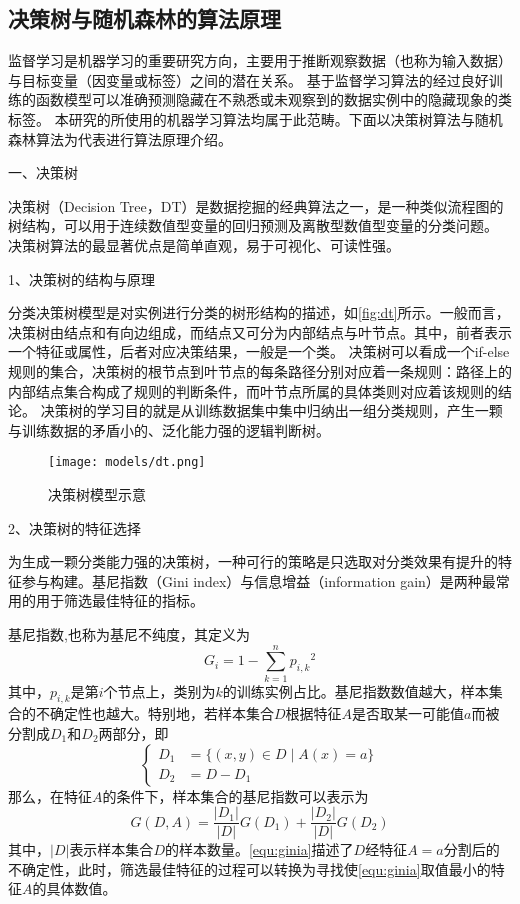 \subsection{决策树与随机森林的算法原理}
监督学习是机器学习的重要研究方向，主要用于推断观察数据（也称为输入数据）与目标变量（因变量或标签）之间的潜在关系。
基于监督学习算法的经过良好训练的函数模型可以准确预测隐藏在不熟悉或未观察到的数据实例中的隐藏现象的类标签。
本研究的所使用的机器学习算法均属于此范畴。下面以决策树算法与随机森林算法为代表进行算法原理介绍。

一、决策树

决策树（Decision Tree，DT）是数据挖掘的经典算法之一，是一种类似流程图的树结构，可以用于连续数值型变量的回归预测及离散型数值型变量的分类问题\cite{Li2017,Liu2018}。
决策树算法的最显著优点是简单直观，易于可视化、可读性强。

1、决策树的结构与原理

分类决策树模型是对实例进行分类的树形结构的描述，如\autoref{fig:dt}所示。一般而言，决策树由结点和有向边组成，而结点又可分为内部结点与叶节点。其中，前者表示一个特征或属性，后者对应决策结果，一般是一个类\cite{Li2017,Zhou2016}。
决策树可以看成一个if-else规则的集合，决策树的根节点到叶节点的每条路径分别对应着一条规则：路径上的内部结点集合构成了规则的判断条件，而叶节点所属的具体类则对应着该规则的结论。
决策树的学习目的就是从训练数据集中集中归纳出一组分类规则，产生一颗与训练数据的矛盾小的、泛化能力强的逻辑判断树。
\begin{figure}[htbp]
      \centering
      \texttt{[image: models/dt.png]}
      \caption{\label{fig:dt}决策树模型示意}
\end{figure}

2、决策树的特征选择

为生成一颗分类能力强的决策树，一种可行的策略是只选取对分类效果有提升的特征参与构建。基尼指数（Gini index）与信息增益（information gain）是两种最常用的用于筛选最佳特征的指标。

基尼指数,也称为基尼不纯度，其定义为
\begin{equation}
      \label{equ:gini}
      G_i = 1 - \sum_{k=1}^n{p_{i,k}}^2
\end{equation}
其中，$p_{i,k}$是第$i$个节点上，类别为$k$的训练实例占比。基尼指数数值越大，样本集合的不确定性也越大。特别地，若样本集合$D$根据特征$A$是否取某一可能值$a$而被分割成$D_1$和$D_2$两部分，即
\begin{equation}
      \label{equ:daset}
      \left \{
      \begin{aligned}
            D_1 &= \{ (x,y) \in D \mid A(x) = a\} \\
            D_2 &= D - D_1
      \end{aligned}
      \right.
      \end{equation}
那么，在特征$A$的条件下，样本集合的基尼指数可以表示为
\begin{equation}
      \label{equ:ginia}
      G(D,A) = \frac{|D_1|}{|D|}G(D_1) + \frac{|D_2|}{|D|}G(D_2)
\end{equation}
其中，$|D|$表示样本集合$D$的样本数量。\autoref{equ:ginia}描述了$D$经特征$A=a$分割后的不确定性，此时，筛选最佳特征的过程可以转换为寻找使\autoref{equ:ginia}取值最小的特征$A$的具体数值。

